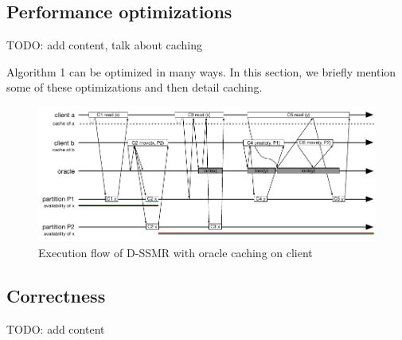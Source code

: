 \subsection{Performance optimizations}
\label{sec:optm}
TODO: add content, talk about caching

Algorithm 1 can be optimized in many ways. In this section, we briefly mention some of these optimizations and then detail caching.

\begin{figure}
\begin{minipage}[b]{1\linewidth} %
\centering
      \includegraphics[width=0.85\linewidth]{figures/cache}
\end{minipage}
\caption{Execution flow of D-SSMR with oracle caching on client}
\label{fig:cache}
\end{figure}


\subsection{Correctness}
\label{sec:correctness}
TODO: add content